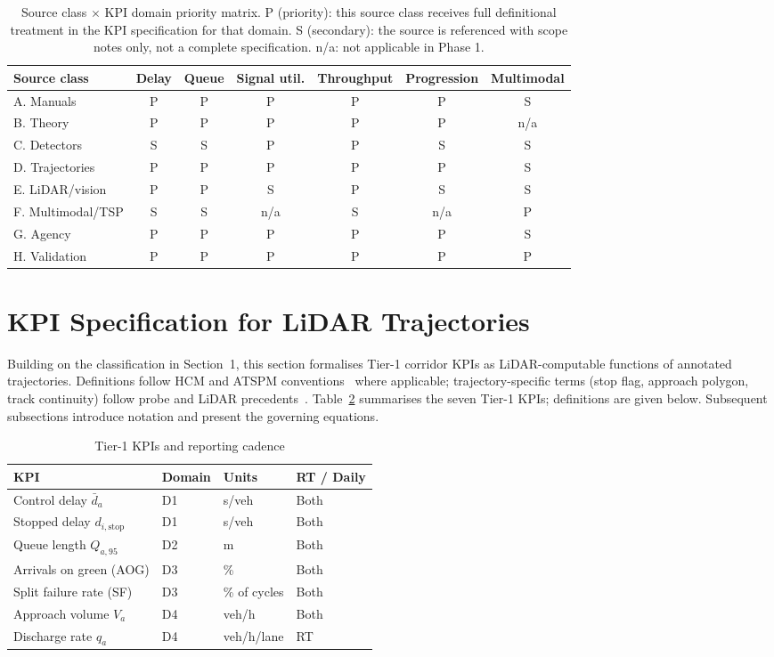 \documentclass[11pt]{article}
\begin{document}
\begin{table}[htbp]
\centering
\caption{Source class $\times$ KPI domain priority matrix. P (priority): this source class receives full definitional treatment in the KPI specification for that domain. S (secondary): the source is referenced with scope notes only, not a complete specification. n/a: not applicable in Phase 1.}
\label{tab:priority}
\scriptsize
\begin{tabular}{@{}lcccccc@{}}
\toprule
Source class & Delay & Queue & Signal util. & Throughput & Progression & Multimodal \\
\midrule
A. Manuals & P & P & P & P & P & S \\
B. Theory & P & P & P & P & P & n/a \\
C. Detectors & S & S & P & P & S & S \\
D. Trajectories & P & P & P & P & P & S \\
E. LiDAR/vision & P & P & S & P & S & S \\
F. Multimodal/TSP & S & S & n/a & S & n/a & P \\
G. Agency & P & P & P & P & P & S \\
H. Validation & P & P & P & P & P & P \\
\bottomrule
\end{tabular}
\end{table}

\section{KPI Specification for LiDAR Trajectories}

Building on the classification in Section~1, this section formalises Tier-1 corridor KPIs as LiDAR-computable functions of annotated trajectories. Definitions follow HCM and ATSPM conventions~\cite{hcm,smaglik} where applicable; trajectory-specific terms (stop flag, approach polygon, track continuity) follow probe and LiDAR precedents~\cite{bhaskar,kotb}. Table~\ref{tab:tier1} summarises the seven Tier-1 KPIs; definitions are given below. Subsequent subsections introduce notation and present the governing equations.

\begin{table}[htbp]
\centering
\caption{Tier-1 KPIs and reporting cadence}
\label{tab:tier1}
\small
\begin{tabular}{@{}llll@{}}
\toprule
KPI & Domain & Units & RT / Daily \\
\midrule
Control delay $\bar d_a$ & D1 & s/veh & Both \\
Stopped delay $d_{i,\mathrm{stop}}$ & D1 & s/veh & Both \\
Queue length $Q_{a,95}$ & D2 & m & Both \\
Arrivals on green (AOG) & D3 & \% & Both \\
Split failure rate (SF) & D3 & \% of cycles & Both \\
Approach volume $V_a$ & D4 & veh/h & Both \\
Discharge rate $q_a$ & D4 & veh/h/lane & RT \\
\bottomrule
\end{tabular}
\end{table}
\end{document}
